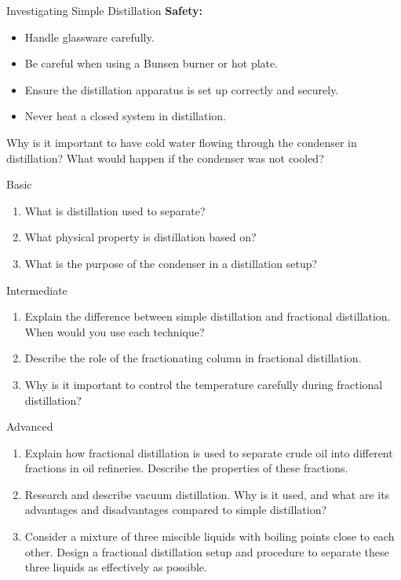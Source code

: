 \begin{investigation}{Investigating Simple Distillation}
\textbf{Safety:}
\begin{itemize}
    \item Handle glassware carefully.
    \item Be careful when using a Bunsen burner or hot plate.
    \item Ensure the distillation apparatus is set up correctly and securely.
    \item Never heat a closed system in distillation.
\end{itemize}
\end{investigation}

\begin{stopandthink}
Why is it important to have cold water flowing through the condenser in distillation? What would happen if the condenser was not cooled?
\end{stopandthink}

\begin{tieredquestions}{Basic}
\begin{enumerate}
    \item What is distillation used to separate?
    \item What physical property is distillation based on?
    \item What is the purpose of the condenser in a distillation setup?
\end{enumerate}
\end{tieredquestions}

\begin{tieredquestions}{Intermediate}
\begin{enumerate}
    \item Explain the difference between simple distillation and fractional distillation. When would you use each technique?
    \item Describe the role of the fractionating column in fractional distillation.
    \item  Why is it important to control the temperature carefully during fractional distillation?
\end{enumerate}
\end{tieredquestions}

\begin{tieredquestions}{Advanced}
\begin{enumerate}
    \item  Explain how fractional distillation is used to separate crude oil into different fractions in oil refineries. Describe the properties of these fractions.
    \item  Research and describe vacuum distillation. Why is it used, and what are its advantages and disadvantages compared to simple distillation?
    \item  Consider a mixture of three miscible liquids with boiling points close to each other. Design a fractional distillation setup and procedure to separate these three liquids as effectively as possible.
\end{enumerate}
\end{tieredquestions}


